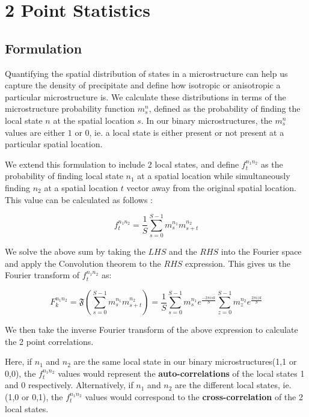 \documentclass[12pt, a4paper]{report}
\begin{document}

\section{2 Point Statistics}
\subsection{Formulation}
Quantifying the spatial distribution of states in a microstructure can help us capture the density of precipitate and define how isotropic or anisotropic a particular microstructure is. We calculate these distributions in terms of the microstructure probability function $m_s^n$, defined as the probability of finding the local state $n$ at the spatial location $s$. In our binary microstructures, the $m_s^n$ values are either $1$ or $0$, ie. a local state is either present or not present at a particular spatial location. 

We extend this formulation to include 2 local states, and define $f_t^{n_1n_2}$ as the probability of finding local state $n_1$ at a spatial location while simultaneously finding $n_2$ at a spatial location $t$ vector away from the original spatial location. This value can be calculated as follows \cite{4fullwood2008microstructure}:

\begin{equation}
f_t^{n_1n_2} = \frac{1}{S}\sum_{s=0}^{S-1} {m_s^{n_1}}{m_{s+t}^{n_2}}
\end{equation}

We solve the above sum by taking the $LHS$ and the $RHS$ into the Fourier space and apply the Convolution theorem to the $RHS$ expression. This gives us the Fourier transform of $f_t^{n_1n_2}$ as:

\begin{equation}
F_k^{n_1n_2} =\mathfrak{F}(\sum_{s=0}^{S-1}{m_s^{n_1}}{m_{s+t}^{n_2}})= \frac{1}{S} \sum_{s=0}^{S-1}{m_s^{n_1}}{e^{\frac{-2{\pi}isk}{S}}}  \sum_{z=0}^{S-1}{m_z^{n_2}}{e^{\frac{2{\pi}izk}{S}}}
\end{equation}


We then take the inverse Fourier transform of the above expression to calculate the 2 point correlations. 

Here, if $n_1$ and $n_2$ are the same local state in our binary microstructures({1,1} or {0,0}), the $f_t^{n_1n_2}$ values would represent the \textbf{auto-correlations} of the local states 1 and 0 respectively. Alternatively, if $n_1$ and $n_2$ are the different local states, ie. ({1,0} or {0,1}), the $f_t^{n_1n_2}$ values would correspond to the \textbf{cross-correlation} of the 2 local states.
\end{document}
